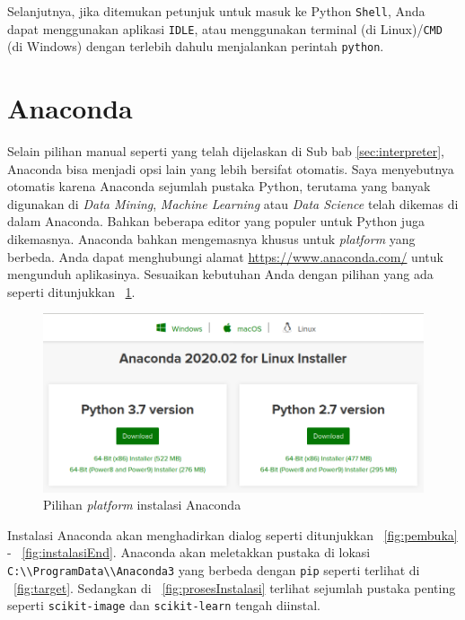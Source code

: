 Selanjutnya, jika ditemukan petunjuk untuk masuk ke Python \texttt{Shell}, Anda dapat menggunakan aplikasi \texttt{IDLE}\texttt{}, atau menggunakan terminal (di Linux)/\texttt{CMD} (di Windows) dengan terlebih dahulu menjalankan perintah \texttt{python}.

\section{Anaconda}
Selain pilihan manual seperti yang telah dijelaskan di Sub bab \ref{sec:interpreter}, Anaconda bisa menjadi opsi lain yang lebih bersifat otomatis. Saya menyebutnya otomatis karena Anaconda sejumlah pustaka Python, terutama yang banyak digunakan di \textit{Data Mining}, \textit{Machine Learning} atau \textit{Data Science} telah dikemas di dalam Anaconda. Bahkan beberapa editor yang populer untuk Python juga dikemasnya. Anaconda bahkan mengemasnya khusus untuk \textit{platform} yang berbeda. Anda dapat menghubungi alamat \url{https://www.anaconda.com/} untuk mengunduh aplikasinya. Sesuaikan kebutuhan Anda dengan pilihan yang ada seperti ditunjukkan \figurename~\ref{fig:platformAnaconda}.

\begin{figure}
  \begin{center}
    \includegraphics[scale=.5]{pics/anacondaInstall0.png}
    \caption{Pilihan \textit{platform} instalasi Anaconda}
    \label{fig:platformAnaconda}
  \end{center}
\end{figure}

Instalasi Anaconda akan menghadirkan dialog seperti ditunjukkan \figurename~\ref{fig:pembuka} - \figurename~\ref{fig:instalasiEnd}. Anaconda akan meletakkan pustaka di lokasi \texttt{C:\textbackslash\textbackslash ProgramData\textbackslash\textbackslash Anaconda3} yang berbeda dengan \texttt{pip} seperti terlihat di \figurename~\ref{fig:target}. Sedangkan di \figurename~\ref{fig:prosesInstalasi} terlihat sejumlah pustaka penting seperti \texttt{scikit-image} dan \texttt{scikit-learn} tengah diinstal. 

